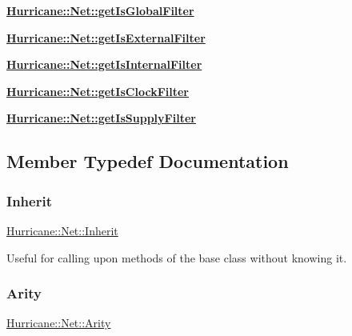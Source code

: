 \begin{DoxyItemize}
\item {\bfseries \mbox{\hyperlink{classHurricane_1_1Net_a1730ed1247cd9bce7fcf519ea60dc738}{Hurricane\+::\+Net\+::get\+Is\+Global\+Filter}}}
\item {\bfseries \mbox{\hyperlink{classHurricane_1_1Net_a3af91a80e219e37e70229e61dfd385da}{Hurricane\+::\+Net\+::get\+Is\+External\+Filter}}}
\item {\bfseries \mbox{\hyperlink{classHurricane_1_1Net_a7a2d1c4ab84bf81a16e24557d2342ea5}{Hurricane\+::\+Net\+::get\+Is\+Internal\+Filter}}}
\item {\bfseries \mbox{\hyperlink{classHurricane_1_1Net_afdb2269f3a88923c25264f6f785372a1}{Hurricane\+::\+Net\+::get\+Is\+Clock\+Filter}}}
\item {\bfseries \mbox{\hyperlink{classHurricane_1_1Net_ac241f44abf1f332004dd6103ee1dfa48}{Hurricane\+::\+Net\+::get\+Is\+Supply\+Filter}}} 
\end{DoxyItemize}

\subsection{Member Typedef Documentation}
\mbox{\label{classHurricane_1_1Net_a3f1ac0fcb03638b2ffa9af6a9a58de15}} 
\subsubsection{\texorpdfstring{Inherit}{Inherit}}
{\footnotesize\ttfamily \mbox{\hyperlink{classHurricane_1_1Net_a3f1ac0fcb03638b2ffa9af6a9a58de15}{Hurricane\+::\+Net\+::\+Inherit}}}

Useful for calling upon methods of the base class without knowing it. \mbox{\label{classHurricane_1_1Net_a3a242d929e0c733f90f3f69be8cc427b}} 
\subsubsection{\texorpdfstring{Arity}{Arity}}
{\footnotesize\ttfamily \mbox{\hyperlink{classHurricane_1_1Net_a3a242d929e0c733f90f3f69be8cc427b}{Hurricane\+::\+Net\+::\+Arity}}}

